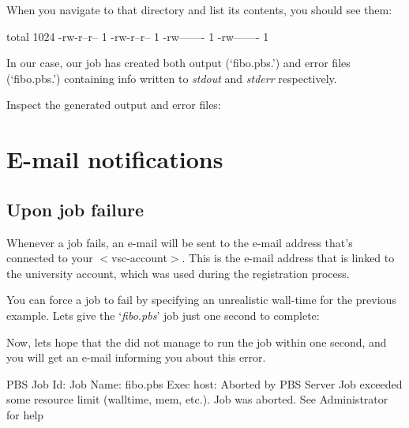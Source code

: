 When you navigate to that directory and list its contents, you should see them:

\begin{prompt}
total 1024
-rw-r--r-- 1 %
-rw-r--r-- 1 %
-rw------- 1 %
-rw------- 1 %
\end{prompt}

In our case, our job has created both output (`fibo.pbs.\jobnumber') and
error files (`fibo.pbs.\jobnumber') containing info written to
\emph{stdout} and \emph{stderr} respectively.

Inspect the generated output and error files:

\begin{prompt}
\end{prompt}

\section{E-mail notifications}

\subsection{Upon job failure}

Whenever a job fails, an e-mail will be sent to the e-mail address that's
connected to your $<$vsc-account$>$. This is the e-mail address that is linked
to the university account, which was used during the registration process.

You can force a job to fail by specifying an unrealistic wall-time for the
previous example.  Lets give the `\emph{fibo.pbs}' job just one second to
complete:

\begin{prompt}
\end{prompt}

Now, lets hope that the \hpc did not manage to run the job within one second,
and you will get an e-mail informing you about this error.

\begin{flattext}
PBS Job Id: %
Job Name:   fibo.pbs
Exec host:  %
Aborted by PBS Server
Job exceeded some resource limit (walltime, mem, etc.). Job was aborted.
See Administrator for help
\end{flattext}

